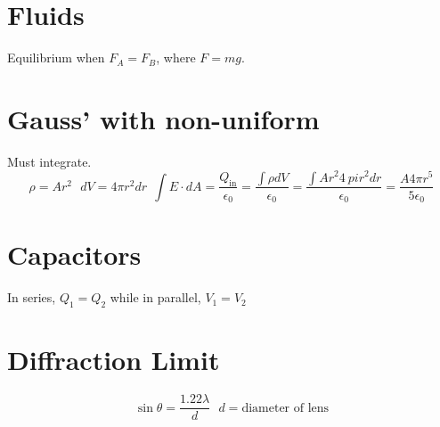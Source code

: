 \documentclass[10pt,letter]{article}
\begin{document}
\section{Fluids} %
\label{sec:fluids}
Equilibrium when $F_A = F_B$, where $F=mg$. 

\section{Gauss' with non-uniform} %
\label{sec:gauss_with_non_uniform}
Must integrate. 
\begin{equation}
    \rho = Ar^2 ~~~ dV = 4\pi r^2dr ~~ \int E \cdot dA = \frac{Q_{\textrm{in}}}{\epsilon_0} = \frac{\int \rho dV}{\epsilon_0} = \frac{\int Ar^2 4\ pi r^2 dr}{\epsilon_0} = \frac{A 4\pi r^5}{5 \epsilon_0}
\end{equation}

\section{Capacitors} %
\label{sec:capacitors}
In series, $Q_1 = Q_2$ while in parallel, $V_1 = V_2$

\section{Diffraction Limit} %
\label{sec:diffraction_limit}
\begin{equation}
    \sin \theta = \frac{1.22 \lambda}{d}~~~d=\textrm{diameter of lens}
\end{equation}
\end{document}
